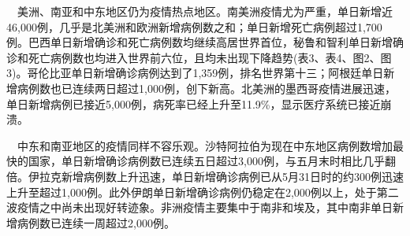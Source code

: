 \documentclass[
]{article}
\begin{document}
\newpage

\(\quad\)美洲、南亚和中东地区仍为疫情热点地区。南美洲疫情尤为严重，单日新增近46,000例，几乎是北美洲和欧洲新增病例数之和；单日新增死亡病例超过1,700例。巴西单日新增确诊和死亡病例数均继续高居世界首位，秘鲁和智利单日新增确诊和死亡病例数也均进入世界前六位，且均未出现下降趋势(表3、表4、图2、图3)。哥伦比亚单日新增确诊病例达到了1,359例，排名世界第十三；阿根廷单日新增病例数也已连续两日超过1,000例，创下新高。北美洲的墨西哥疫情进展迅速，单日新增病例已接近5,000例，病死率已经上升至11.9\%，显示医疗系统已接近崩溃。

\(\quad\)中东和南亚地区的疫情同样不容乐观。沙特阿拉伯为现在中东地区病例数增加最快的国家，单日新增确诊病例数已连续五日超过3,000例，与五月末时相比几乎翻倍。伊拉克新增病例数上升迅速，单日新增确诊病例已从5月31日时的约300例迅速上升至超过1,000例。此外伊朗单日新增确诊病例仍稳定在2,000例以上，处于第二波疫情之中尚未出现好转迹象。非洲疫情主要集中于南非和埃及，其中南非单日新增病例数已连续一周超过2,000例。
\end{document}
